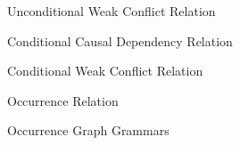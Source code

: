 \begin{definition}{Unconditional Weak Conflict Relation}
\end{definition}

\begin{definition}{Conditional Causal Dependency Relation}
\end{definition}

\begin{definition}{Conditional Weak Conflict Relation}
\end{definition}

\begin{definition}{Occurrence Relation}
\end{definition}

\begin{definition}{Occurrence Graph Grammars}
\end{definition}
